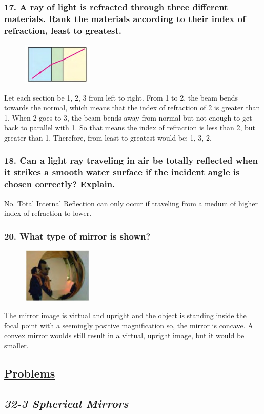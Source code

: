 \documentclass{article}
\begin{document}
\subsubsection*{
    17. A ray of light is refracted through three different materials.
    Rank the materials according to their index of refraction,
    least to greatest.
}
\begin{figure}[h]
    \begin{center}
        \includegraphics[width=0.3\textwidth]{figures/q17.jpg}
    \end{center}
\end{figure}
Let each section be 1, 2, 3 from left to right. From 1 to 2, the beam bends
towards the normal, which means that the index of refraction of 2 is greater
than 1. When 2 goes to 3, the beam bends away from normal but not enough to get
back to parallel with 1. So that means the index of refraction is less than 2,
but greater than 1. Therefore, from least to greatest would be: 1, 3, 2.
\subsubsection*{
    18. Can a light ray traveling in air be totally reflected when it
    strikes a smooth water surface if the incident angle is chosen
    correctly? Explain.
}
No. Total Internal Reflection can only occur if traveling from a medum of higher
index of refraction to lower.
\subsubsection*{
    20. What type of mirror is shown?
}
\begin{figure}[h]
    \begin{center}
        \includegraphics[width=0.3\textwidth]{figures/q20.jpg}
    \end{center}
\end{figure}
The mirror image is virtual and upright and the object is standing inside the
focal point with a seemingly positive magnification so, the mirror is concave.
A convex mirror woulds still result in a virtual, upright image, but it would be
smaller. 
\newpage
\begin{center}
    \section*{\textbf{\underline {Problems}}}
    \subsection*{\textbf{\textit{32-3 Spherical Mirrors}}}
\end{center}
\end{document}
